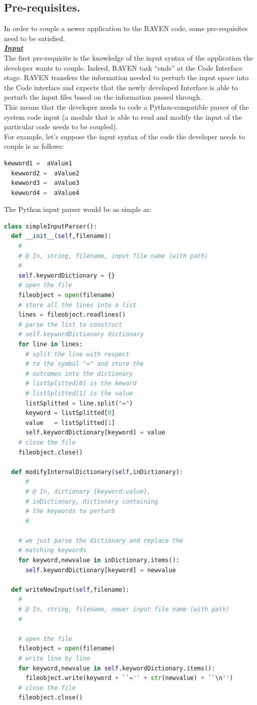 \subsection{Pre-requisites.} 
\label{subsec:prerequisites}
In order to couple a newer application to the RAVEN code, some pre-requisites need to be satisfied.
\newline
\\\textbf{\textit{\underline{Input}}}
\newline
\\ The first pre-requisite is the knowledge of the input 
syntax of the application the developer wants to couple. Indeed, RAVEN task
 ``ends'' at the Code Interface stage. RAVEN transfers the information needed 
 to perturb the input space into the Code interface and expects that the newly 
 developed Interface is able to perturb the input files based on the information 
 passed through.
\\This means that the developer needs to code a Python-compatible parser of
 the system code input (a module that is able to read and modify the input of 
 the particular code needs to be coupled).
\\ For example, let's suppose the input syntax of the code the developer needs 
to couple is as follows:
\begin{lstlisting}[language=python]
  kewword1 =  aValue1
  kewword2 =  aValue2
  kewword3 =  aValue3
  kewword4 =  aValue4
\end{lstlisting} 
The Python input parser would be as simple as:
\begin{lstlisting}[language=python]
class simpleInputParser():
  def __init__(self,filename):
    # 
    # @ In, string, filename, input file name (with path)
    #
    self.keywordDictionary = {}
    # open the file
    fileobject = open(filename)
    # store all the lines into a list
    lines = fileobject.readlines()
    # parse the list to construct 
    # self.keywordDictionary dictionary
    for line in lines:
      # split the line with respect
      # to the symbol "=" and store the
      # outcomes into the dictionary
      # listSplitted[0] is the keword
      # listSplitted[1] is the value
      listSplitted = line.split("=")
      keyword = listSplitted[0]
      value   = listSplitted[1]
      self.keywordDictionary[keyword] = value
    # close the file
    fileobject.close()
   
  def modifyInternalDictionary(self,inDictionary):
      # 
      # @ In, dictionary {keyword:value}, 
      # inDictionary, dictionary containing
      # the keywords to perturb 
      #

    # we just parse the dictionary and replace the
    # matching keywords
    for keyword,newvalue in inDictionary.items():
      self.keywordDictionary[keyword] = newvalue

  def writeNewInput(self,filename):
    #
    # @ In, string, filename, newer input file name (with path)
    #

    # open the file
    fileobject = open(filename)
    # write line by line
    for keyword,newvalue in self.keywordDictionary.items():
      fileobject.write(keyword + ``='' + str(newvalue) + ``\n'')
    # close the file
    fileobject.close()
\end{lstlisting} 
